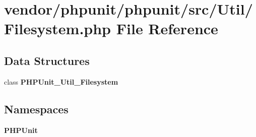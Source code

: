 \section{vendor/phpunit/phpunit/src/\+Util/\+Filesystem.php File Reference}
\label{phpunit_2phpunit_2src_2_util_2_filesystem_8php}
\subsection*{Data Structures}
\begin{DoxyCompactItemize}
\item 
class {\bf P\+H\+P\+Unit\+\_\+\+Util\+\_\+\+Filesystem}
\end{DoxyCompactItemize}
\subsection*{Namespaces}
\begin{DoxyCompactItemize}
\item 
 {\bf P\+H\+P\+Unit}
\end{DoxyCompactItemize}
